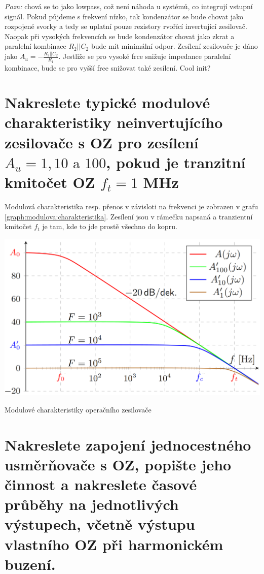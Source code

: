 \documentclass[a4paper,12pt]{article}   %
\begin{document}
\textit{Pozn:} chová se to jako lowpass, což není náhoda u systémů, co integrují vstupní signál. Pokud půjdeme s frekvení nízko, tak kondenzátor se bude chovat jako rozpojené svorky a tedy se uplatní pouze rezistory rvořící invertující zesilovač. Naopak při vysokých frekvencích se bude kondenzátor chovat jako zkrat a paralelní kombinace $R_2||C_2$ bude mít minimální odpor. Zesílení zesilovače je dáno jako $A_u = -\frac{R_2||C_2}{R_1}$. Jestliže se pro vysoké frce snižuje impedance paralelní kombinace, bude se pro vyšší frce snižovat také zesílení. Cool init?






\section{Nakreslete typické modulové charakteristiky neinvertujícího zesilovače s OZ pro zesílení $A_u = 1, 10 \text{ a } 100$, pokud je tranzitní kmitočet OZ $f_t=1$ MHz}
Modulová charakteristika resp. přenos v závisloti na frekvenci je zobrazen v grafu \ref{graph:modulova:charakteristika}. Zesílení jsou v rámečku napsaná a tranzientní kmitočet $f_t$ je tam, kde to jde prostě všechno do kopru.
\begin{graf}
    \centering
    \includegraphics[width=.7\textwidth]{opamp-modulove_charakteristiky.PNG}
    \caption{Modulové charakteristiky operačního zesilovače}
    \label{graph:modulova:charakteristika}
\end{graf}








\section{Nakreslete zapojení jednocestného usměrňovače s OZ, popište jeho činnost a nakreslete časové průběhy na jednotlivých výstupech, včetně výstupu vlastního OZ při harmonickém buzení.}
\end{document}
